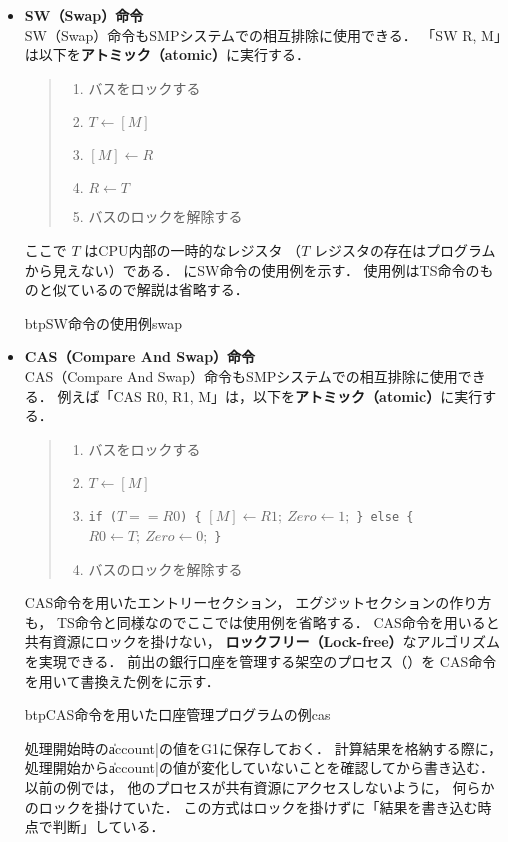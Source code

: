 \begin{itemize}
\item {\bf SW（Swap）命令} \\
SW（Swap）命令もSMPシステムでの相互排除に使用できる．
「SW  R, M」は以下を{\bf アトミック（atomic）}に実行する．

\begin{quote}
\begin{enumerate}
\item バスをロックする
\item $T \leftarrow [M]$
\item $[M] \leftarrow R$
\item $R \leftarrow T$
\item バスのロックを解除する
\end{enumerate}
\end{quote}

ここで $T$ はCPU内部の一時的なレジスタ
（$T$ レジスタの存在はプログラムから見えない）である．
にSW命令の使用例を示す．
使用例はTS命令のものと似ているので解説は省略する．

\begin{myfig}{btp}{SW命令の使用例}{swap}

\end{myfig}

\item {\bf CAS（Compare And Swap）命令}\\
CAS（Compare And Swap）命令もSMPシステムでの相互排除に使用できる．
例えば「CAS  R0, R1, M」は，以下を{\bf アトミック（atomic）}に実行する．

\begin{quote}
\begin{enumerate}
\item バスをロックする
\item $T \leftarrow [M]$
\item {\tt if ($T==R0$) \{} $[M] \leftarrow R1;~ Zero \leftarrow 1;$
      {\tt \} else \{} $R0 \leftarrow T;~  Zero \leftarrow 0;$ {\tt \}}
\item バスのロックを解除する
\end{enumerate}
\end{quote}

CAS命令を用いたエントリーセクション，
エグジットセクションの作り方も，
TS命令と同様なのでここでは使用例を省略する．
CAS命令を用いると共有資源にロックを掛けない，
{\bf ロックフリー（Lock-free）}なアルゴリズムを実現できる．
前出の銀行口座を管理する架空のプロセス（）を
CAS命令を用いて書換えた例をに示す．

\begin{myfig}{btp}{CAS命令を用いた口座管理プログラムの例}{cas}

\end{myfig}

処理開始時の\|account|の値をG1に保存しておく．
計算結果を格納する際に，
処理開始から\|account|の値が変化していないことを確認してから書き込む．
以前の例では，
他のプロセスが共有資源にアクセスしないように，
何らかのロックを掛けていた．
この方式はロックを掛けずに「結果を書き込む時点で判断」している．
\end{itemize}

